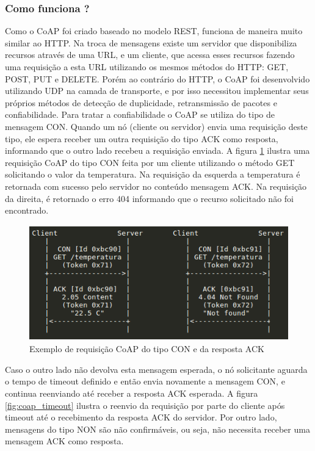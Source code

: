 \subsubsection*{Como funciona ?}
Como o CoAP foi criado baseado no modelo REST, funciona de maneira muito similar ao HTTP. Na troca de mensagens existe um servidor que disponibiliza recursos através de uma URL, e um cliente, que acessa esses recursos fazendo uma requisição a esta URL utilizando os mesmos métodos do HTTP: GET, POST, PUT e DELETE. Porém ao contrário do HTTP, o CoAP foi desenvolvido utilizando UDP na camada de transporte, e por isso necessitou implementar seus próprios métodos de detecção de duplicidade, retransmissão de pacotes e confiabilidade. Para tratar a confiabilidade o CoAP se utiliza do tipo de mensagem CON. Quando um nó (cliente ou servidor) envia uma requisição deste tipo, ele espera receber um outra requisição do tipo ACK como resposta, informando que o outro lado recebeu a requisição enviada. A figura \ref{fig:coap_success} ilustra uma requisição CoAP do tipo CON feita por um cliente utilizando o método GET solicitando o valor da temperatura. Na requisição da esquerda a temperatura é retornada com sucesso pelo servidor no conteúdo mensagem ACK. Na requisição da direita, é retornado o erro 404 informando que o recurso solicitado não foi encontrado.

\begin{figure}[h]
\centering
\includegraphics[height=5cm]{figuras/coap_request_success.png}
\caption{Exemplo de requisição CoAP do tipo CON e da resposta ACK}
\label{fig:coap_success}
\end{figure}

Caso o outro lado não devolva esta mensagem esperada, o nó solicitante  aguarda o tempo de timeout definido e então envia novamente a mensagem CON, e continua reenviando até receber a resposta ACK esperada. A figura \ref{fig:coap_timeout} ilustra o reenvio da requisição por parte do cliente após timeout até o recebimento da resposta ACK do servidor. Por outro lado, mensagens do tipo NON são não confirmáveis, ou seja, não necessita receber uma mensagem ACK como resposta.

